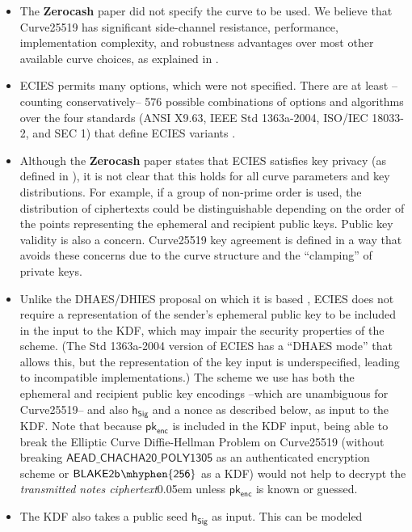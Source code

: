 \documentclass{article}
\newcommand{\term}[1]{\textsl{#1}\kern 0.05em\xspace}
\newcommand{\termbf}[1]{\textbf{#1}\xspace}
\newcommand{\Zerocash}{\termbf{Zerocash}}
\newcommand{\notesCiphertext}{\term{transmitted notes ciphertext}}
\newcommand{\Blake}[1]{\mathsf{BLAKE2b\kern 0.05em\mhyphen{#1}}}
\newcommand{\TransmitPublic}{\mathsf{pk_{enc}}}
\newcommand{\SymSpecific}{\mathsf{AEAD\_CHACHA20\_POLY1305}}
\newcommand{\hSig}{\mathsf{h_{Sig}}}
\begin{document}
\begin{itemize}
  \item The \Zerocash paper did not specify the curve to be used.
        We believe that Curve25519 has significant side-channel resistance,
        performance, implementation complexity, and robustness advantages
        over most other available curve choices, as explained in \cite{Bern2006}.
  \item ECIES permits many options, which were not specified. There are at least
        --counting conservatively-- 576 possible combinations of options and
        algorithms over the four standards (ANSI X9.63, IEEE Std 1363a-2004,
        ISO/IEC 18033-2, and SEC 1) that define ECIES variants \cite{MAEA2010}.
  \item Although the \Zerocash paper states that ECIES satisfies key privacy
        (as defined in \cite{BBDP2001}), it is not clear that this holds for
        all curve parameters and key distributions. For example, if a group of
        non-prime order is used, the distribution of ciphertexts could be
        distinguishable depending on the order of the points representing the
        ephemeral and recipient public keys. Public key validity is also a concern.
        Curve25519 key agreement is defined in a way that avoids these concerns
        due to the curve structure and the ``clamping'' of private keys.
  \item Unlike the DHAES/DHIES proposal on which it is based \cite{ABR1999}, ECIES
        does not require a representation of the sender's ephemeral public key
        to be included in the input to the KDF, which may impair the security
        properties of the scheme. (The Std 1363a-2004 version of ECIES \cite{IEEE2004}
        has a ``DHAES mode'' that allows this, but the representation of the key
        input is underspecified, leading to incompatible implementations.)
        The scheme we use has both the ephemeral and recipient public key
        encodings --which are unambiguous for Curve25519-- and also $\hSig$ and
        a nonce as described below, as input to the KDF. Note that because
        $\TransmitPublic$ is included in the KDF input, being able to break the
        Elliptic Curve Diffie-Hellman Problem on Curve25519 (without breaking
        $\SymSpecific$ as an authenticated encryption scheme or $\Blake{256}$ as
        a KDF) would not help to decrypt the \notesCiphertext unless
        $\TransmitPublic$ is known or guessed.
  \item The KDF also takes a public seed $\hSig$ as input. This can be modeled

\end{itemize}
\end{document}
